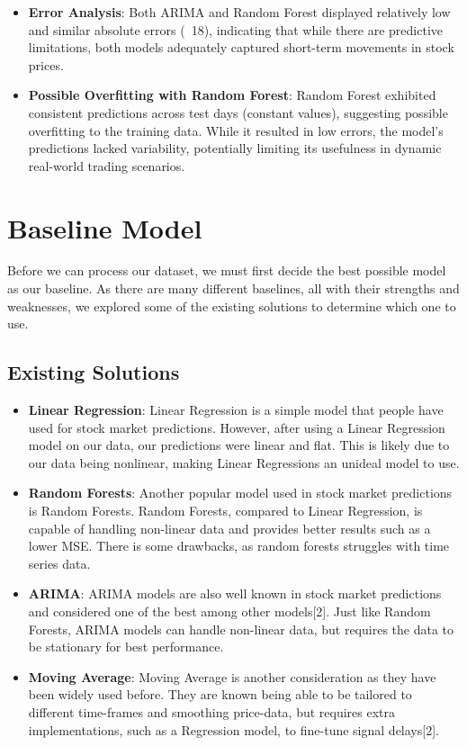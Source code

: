 \documentclass[conference]{IEEEtran}
\begin{document}
\begin{itemize}
    \item \textbf{Error Analysis}: Both ARIMA and Random Forest displayed relatively low and similar absolute errors (~18), indicating that while there are predictive limitations, both models adequately captured short-term movements in stock prices.
    \item \textbf{Possible Overfitting with Random Forest}: Random Forest exhibited consistent predictions across test days (constant values), suggesting possible overfitting to the training data. While it resulted in low errors, the model’s predictions lacked variability, potentially limiting its usefulness in dynamic real-world trading scenarios.
\end{itemize}

\section{Baseline Model}

Before we can process our dataset, we must first decide the best possible model as our baseline. As there are many different baselines, all with their strengths and weaknesses, we explored some of the existing solutions to determine which one to use.

\subsection{Existing Solutions}

\begin{itemize}

    \item \textbf{Linear Regression}: Linear Regression is a simple model that people have used for stock market predictions. However, after using a Linear Regression model on our data, our predictions were linear and flat. This is likely due to our data being nonlinear, making Linear Regressions an unideal model to use.   

    \item \textbf{Random Forests}: Another popular model used in stock market predictions is Random Forests. Random Forests, compared to Linear Regression, is capable of handling non-linear data and provides better results such as a lower MSE. There is some drawbacks, as random forests struggles with time series data.

    \item \textbf{ARIMA}: ARIMA models are also well known in stock market predictions and considered one of the best among other models[2]. Just like Random Forests, ARIMA models can handle non-linear data, but requires the data to be stationary for best performance. 

    \item \textbf{Moving Average}: Moving Average is another consideration as they have been widely used before. They are known being able to be tailored to different time-frames and smoothing price-data, but requires extra implementations, such as a Regression model, to fine-tune signal delays[2].

\end{itemize}
\end{document}
